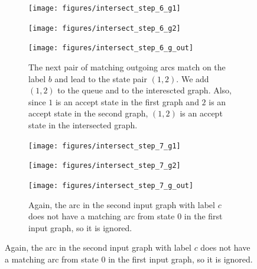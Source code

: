 \begin{figure}
\end{figure}

\begin{figure}\ContinuedFloat
    \begin{subfigure}{\linewidth}
        \begin{minipage}{0.22\textwidth}
            \centering
            \texttt{[image: figures/intersect\_step\_6\_g1]}
        \end{minipage}
        \begin{minipage}{0.37\textwidth}
            \centering
            \texttt{[image: figures/intersect\_step\_6\_g2]}
        \end{minipage}
        \begin{minipage}{0.37\textwidth}
            \centering
            \texttt{[image: figures/intersect\_step\_6\_g\_out]}
        \end{minipage}
        \caption{The next pair of matching outgoing arcs match on the label $b$
        and lead to the state pair $(1, 2)$. We add $(1, 2)$ to the queue and
        to the interescted graph. Also, since $1$ is an accept state in the
        first graph and $2$ is an accept state in the second graph, $(1, 2)$ is
        an accept state in the intersected graph.}
    \end{subfigure}

    \begin{subfigure}{\linewidth}
        \begin{minipage}{0.22\textwidth}
            \centering
            \texttt{[image: figures/intersect\_step\_7\_g1]}
        \end{minipage}
        \begin{minipage}{0.37\textwidth}
            \centering
            \texttt{[image: figures/intersect\_step\_7\_g2]}
        \end{minipage}
        \begin{minipage}{0.37\textwidth}
            \centering
            \texttt{[image: figures/intersect\_step\_7\_g\_out]}
        \end{minipage}
        \caption{Again, the arc in the second input graph with label $c$ does
        not have a matching arc from state $0$ in the first input graph, so it
        is ignored.}
    \end{subfigure}


\end{figure}

